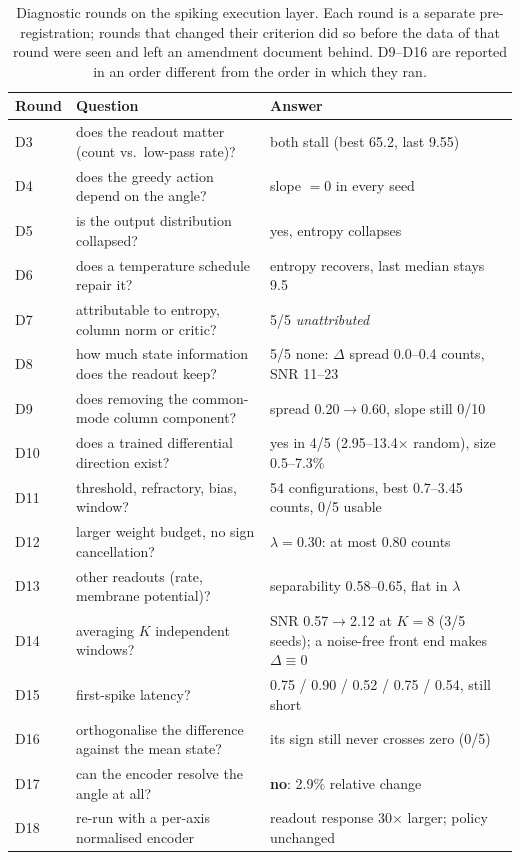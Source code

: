 \documentclass[11pt]{article}
\begin{document}
\begin{table}[h]
\centering
\small
\begin{tabular}{@{}l p{} p{}@{}}
\toprule
Round & Question & Answer \\
\midrule
D3  & does the readout matter (count vs.\ low-pass rate)? & both stall (best 65.2, last 9.55) \\
D4  & does the greedy action depend on the angle?        & slope $=0$ in every seed \\
D5  & is the output distribution collapsed?              & yes, entropy collapses \\
D6  & does a temperature schedule repair it?             & entropy recovers, last median stays 9.5 \\
D7  & attributable to entropy, column norm or critic?    & 5/5 \emph{unattributed} \\
D8  & how much state information does the readout keep?  & 5/5 none: $\Delta$ spread 0.0--0.4 counts, SNR 11--23 \\
D9  & does removing the common-mode column component?    & spread 0.20$\to$0.60, slope still 0/10 \\
D10 & does a trained differential direction exist?       & yes in 4/5 (2.95--13.4$\times$ random), size 0.5--7.3\% \\
D11 & threshold, refractory, bias, window?               & 54 configurations, best 0.7--3.45 counts, 0/5 usable \\
D12 & larger weight budget, no sign cancellation?        & $\lambda{=}0.30$: at most 0.80 counts \\
D13 & other readouts (rate, membrane potential)?         & separability 0.58--0.65, flat in $\lambda$ \\
D14 & averaging $K$ independent windows?                 & SNR 0.57$\to$2.12 at $K{=}8$ (3/5 seeds); a noise-free front end makes $\Delta \equiv 0$ \\
D15 & first-spike latency?                               & 0.75 / 0.90 / 0.52 / 0.75 / 0.54, still short \\
D16 & orthogonalise the difference against the mean state? & its sign still never crosses zero (0/5) \\
D17 & can the encoder resolve the angle at all?          & \textbf{no}: 2.9\% relative change \\
D18 & re-run with a per-axis normalised encoder          & readout response 30$\times$ larger; policy unchanged \\
\bottomrule
\end{tabular}
\caption{Diagnostic rounds on the spiking execution layer. Each round is a
separate pre-registration; rounds that changed their criterion did so before the
data of that round were seen and left an amendment document behind. D9--D16 are
reported in an order different from the order in which they ran.}
\label{tab:spiking-diagnostics}
\end{table}
\end{document}
